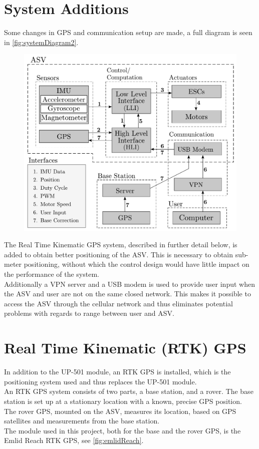 \section{System Additions}
Some changes in GPS and communication setup are made, a full diagram is seen in \autoref{fig:systemDiagram2}.

\begin{figure}[H]
  \includegraphics[width=.65\textwidth]{figures/systemDiagram2}
  \caption{}
  \label{fig:systemDiagram2}
\end{figure}

The Real Time Kinematic GPS system, described in further detail below, is added to obtain better positioning of the ASV. This is necessary to obtain sub-meter positioning, without which the control design would have little impact on the performance of the system.\\
Additionally a VPN server and a USB modem is used to provide user input when the ASV and user are not on the same closed network. This makes it possible to access the ASV through the cellular network and thus eliminates potential problems with regards to range between user and ASV.

\section{Real Time Kinematic (RTK) GPS}
In addition to the UP-501 module, an RTK GPS is installed, which is the positioning system used and thus replaces the UP-501 module.\\
An RTK GPS system consists of two parts, a base station, and a rover.
The base station is set up at a stationary location with a known, precise GPS position.\\
The rover GPS, mounted on the ASV, measures its location, based on GPS satellites and measurements from the base station.\cite{EmlidRTK}\\
The module used in this project, both for the base and the rover GPS, is the Emlid Reach RTK GPS, see \autoref{fig:emlidReach}.

